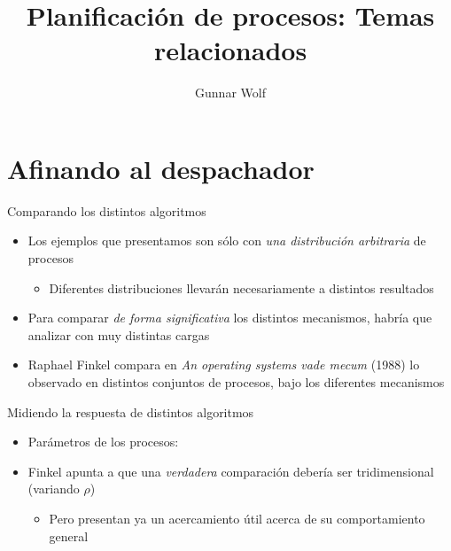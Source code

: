 \documentclass[presentation]{beamer}
\author{Gunnar Wolf}
\date{}
\title{Planificación de procesos: Temas relacionados}
\newcommand{\rarrow}{$\rightarrow$\hskip 0.5em}
\begin{document}
\maketitle

\section{Afinando al despachador}
\label{sec:org8838d76}
\begin{frame}[label={sec:org8271471}]{Comparando los distintos algoritmos}
\begin{itemize}
\item Los ejemplos que presentamos son sólo con \emph{una distribución
arbitraria} de procesos
\begin{itemize}
\item Diferentes distribuciones llevarán necesariamente a distintos
resultados
\end{itemize}
\item Para comparar \emph{de forma significativa} los distintos mecanismos,
habría que analizar con muy distintas cargas
\item Raphael Finkel compara en \emph{An operating systems vade mecum} (1988)
lo observado en distintos conjuntos de procesos, bajo los diferentes
mecanismos
\end{itemize}
\end{frame}

\begin{frame}[label={sec:org5dc2547}]{Midiendo la respuesta de distintos algoritmos}
\begin{itemize}
\item Parámetros de los procesos:
\item Finkel apunta a que una \emph{verdadera} comparación debería ser
tridimensional (variando \(\rho\))
\begin{itemize}
\item Pero presentan ya un acercamiento útil acerca de su comportamiento
general
\end{itemize}
\end{itemize}
\end{frame}
\end{document}
